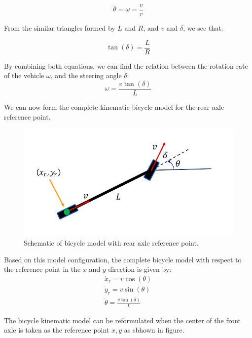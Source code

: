 \begin{equation}
\dot{\theta} = \omega = \frac{v}{r}
\end{equation}


From the similar triangles formed by $L$ and $R$, and $v$ and $\delta$, we see that:

\begin{equation}
\tan(\delta) = \frac{L}{R}
\end{equation}


By combining both equations, we can find the relation between the rotation rate of the vehicle $\omega$, and the steering angle $\delta$:
\begin{equation}
\omega = \frac{v\tan(\delta)}{L}
\end{equation}

We can now form the complete kinematic bicycle model for the rear axle reference point. 
\begin{figure}[!htb]
\begin{center}
\includegraphics[scale=0.290]{img/bicycle_model/bicycle_model_3.jpeg}
\end{center}
\caption{Schematic of bicycle model with rear axle reference point.}
\label{bicycle_model_3}
\end{figure}
Based on this model configuration, the complete bicycle model with respect to the  reference point in the $x$ and $y$ direction is given by:
\begin{eqnarray}
\dot{x}_r = v\cos(\theta) \\
\dot{y}_r = v\sin(\theta) \\
\dot{\theta} = \frac{v\tan(\delta)}{L}
\end{eqnarray}


The bicycle kinematic model can be reformulated when the center of the front axle is taken as the reference point $x, y$ as sbhown in figure. 

